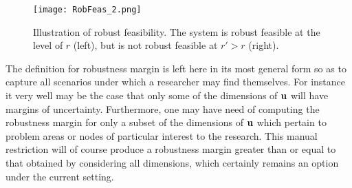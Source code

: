 \begin{figure}[htp!]
\begin{center}
  \texttt{[image: RobFeas\_2.png]}
\end{center}
\caption{Illustration of robust feasibility.
The system is robust feasible at the level of $r$ (left), but is not robust feasible at $r' > r$ (right).}
\label{fig:RobFeas(r)}
\end{figure}

The definition for robustness margin is left here in its most general form so as to capture all scenarios under which a researcher may find themselves.
For instance it very well may be the case that only some of the dimensions of $\mathbf{u}$ will have margins of uncertainty.
Furthermore, one may have need of computing the robustness margin for only a subset of the dimensions of $\mathbf{u}$ which pertain to problem areas or nodes of particular interest to the research.
This manual restriction will of course produce a robustness margin greater than or equal to that obtained by considering all dimensions, which certainly remains an option under the current setting.
